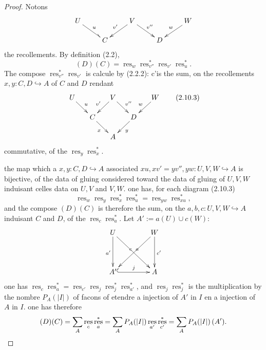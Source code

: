 \documentclass[11pt,a4paper]{article}
\theoremstyle{plain}
\theoremstyle{definition}
\DeclareMathOperator{\res}{res}
\newcommand{\inj}{\hookrightarrow}
\begin{document}
\begin{proof}
Notons
\[
\xymatrix@R=1.2pc{
U \ar@^{->}[dr]^{u} & & V \ar[dl]_{v'} \ar[dr]^{v''} & & W \ar[dl]_{w} \\
& C & & D
}
\]
the recollements. By definition (2.2),
\[
(D)(C) = \res_w \res^*_{v''} \res_{v'} \res^*_u.
\]
The compose $\res^*_{v''} \res_{v'}$ is calcule by (2.2.2): c'is the sum, on the recollements $x, y : C, D \inj A$ of $C$ and $D$ rendant
\begin{equation}
\xymatrix@R=1.2pc@C=1.2pc{
U \ar[dr]^{u} & & V \ar[dl]_{v'} \ar[dr]^{v''} & & W \ar[dl]_{w} \\
& C \ar[dr]_{x} & & D \ar[dl]^{y} & \\
& & A
} \tag{2.10.3}
\end{equation}
commutative, of the $\res_y \res^*_x$.

the map which a $x, y : C, D \inj A$ associated $xu, xv' = yv'', yw : U, V, W \inj A$ is bijective, of the data of gluing considered toward the data of gluing of $U, V, W$ induisant celles data on $U, V$ and $V, W$. one has, for each diagram (2.10.3)
\[
\res_w \res_y \res^*_x \res^*_u = \res_{yw} \res^*_{xu},
\]
and the compose $(D)(C)$ is therefore the sum, on the $a, b, c : U, V, W \inj A$ induisant $C$ and $D$, of the $\res_c \res^*_a$. Let $A' := a(U) \cup c(W)$:
\[
\xymatrix@R=1.5pc@C=1.5pc{
U \ar[dd]_{a'} \ar[ddrr]^{a} & & W \ar[dd]^{c'} \ar[ddll]_{c} \\
& & \\
A' \ar@{^{(}->}[rr]^{j} & & A
}
\]
one has $\res_c \res^*_a = \res_{c'} \res_j \res^*_j \res^*_{a'}$, and $\res_j \res^*_j$ is the multiplication by the nombre $P_A(|I|)$ of facons of etendre a injection of $A'$ in $I$ en a injection of $A$ in $I$. one has therefore
\[
(D)(C) = \sum_A \res_c \res^*_a = \sum_A P_A(|I|) \res_{a'} \res^*_{c'} = \sum_A P_A(|I|)\,(A'). \qedhere
\]
\end{proof}
\end{document}
